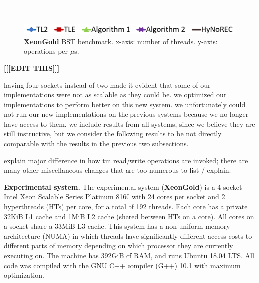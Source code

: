 \begin{figure}
\begin{minipage}{1\linewidth}
\begin{tabular}{m{0.03\linewidth}m{0.485\linewidth}m{0.485\linewidth}}
        \vspace{-5mm}\includegraphics[width=\linewidth]{figures/2021jun16/exp1_nonspec_throughput_exp_'20_0_20_0'_100000_rq_1.png}
        \\
    \end{tabular}
\end{minipage}
	\includegraphics[width=.75\linewidth]{figures/2021jun16/legend.png}
\caption{\textbf{XeonGold} BST benchmark. x-axis: number of threads. y-axis: operations per $\mu$s.}
\label{fig-exp-xeongold}
\end{figure}

\textbf{[[[EDIT THIS]]]}

having four sockets instead of two made it evident that some of our implementations were not as scalable as they could be. we optimized our implementations to perform better on this new system. we unfortunately could not run our new implementations on the previous systems because we no longer have access to them. we include results from all systems, since we believe they are still instructive, but we consider the following results to be not directly comparable with the results in the previous two subsections.

explain major difference in how tm read/write operations are invoked; there are many other miscellaneous changes that are too numerous to list / explain.

\vspace{1mm}\noindent\textbf{Experimental system.}
The experimental system (\textbf{XeonGold}) is a 4-socket Intel Xeon Scalable Series Platinum 8160 with 24 cores per socket and 2 hyperthreads (HTs) per core, for a total of 192 threads.
Each core has a private 32KiB L1 cache and 1MiB L2 cache (shared between HTs on a core).
All cores on a socket share a 33MiB L3 cache.
This system has a non-uniform memory architecture (NUMA) in which threads have significantly different access costs to different parts of memory depending on which processor they are currently executing on.
The machine has 392GiB of RAM, and runs Ubuntu 18.04 LTS.
All code was compiled with the GNU C++ compiler (G++) 10.1 with maximum optimization.

